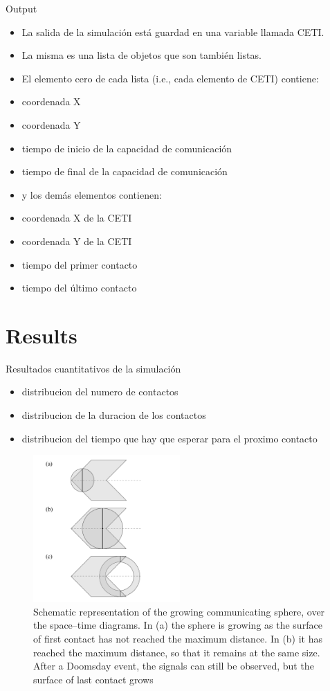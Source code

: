 \documentclass[useAMS,usenatbib]{mnras}
\begin{document}
Output
\begin{itemize}
   \item La salida de la simulación está guardad en una variable llamada CETI.
   \item La misma es una lista de objetos que son también listas.
   \item El elemento cero de cada lista (i.e., cada elemento de CETI) contiene:
   \item coordenada X
   \item coordenada Y
   \item tiempo de inicio de la capacidad de comunicación
   \item tiempo de final de la capacidad de comunicación
   \item y los demás elementos contienen:
   \item coordenada X de la CETI
   \item coordenada Y de la CETI
   \item tiempo del primer contacto
   \item tiempo del último contacto
\end{itemize}



\section{Results}

Resultados cuantitativos de la simulación
\begin{itemize}
   \item distribucion del numero de contactos
   \item distribucion de la duracion de los contactos
   \item distribucion del tiempo que hay que esperar para el proximo contacto
\end{itemize}



\begin{figure}
   \centering
   \includegraphics[width=0.5\textwidth]{growingsphere.pdf}
   \caption{Schematic representation of the growing communicating
   sphere, over the space--time diagrams.  In (a) the sphere is
   growing as the surface of first contact has not reached the maximum
   distance.  In (b) it has reached the maximum distance, so that it
   remains at the same size.  After a Doomsday event, the signals can
   still be observed, but the surface of last contact grows }
   \label{F_sphere}
\end{figure}
\end{document}
